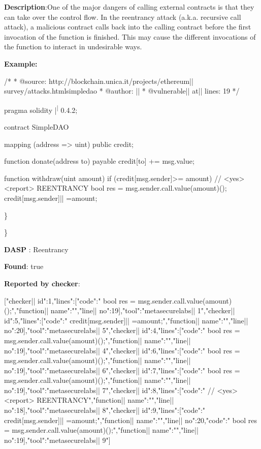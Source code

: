 \documentclass{article}
\begin{document}
\textbf{Description}:One of the major dangers of calling external contracts is that they can take over the control flow. In the reentrancy attack (a.k.a. recursive call attack), a malicious contract calls back into the calling contract before the first invocation of the function is finished. This may cause the different invocations of the function to interact in undesirable ways.


\textbf{Example:} 
\begin{ffcode} 

/*
* @source: http://blockchain.unica.it/projects/ethereum|\textendash| survey/attacks.htmlsimpledao
* @author: |\textendash| 
* @vulnerable|\textunderscore| at|\textunderscore| lines: 19
*/

pragma solidity |\textsuperscript| 0.4.2;

contract SimpleDAO {
  mapping (address => uint) public credit;

  function donate(address to) payable {
    credit[to] += msg.value;
  }

  function withdraw(uint amount) {
    if (credit[msg.sender]>= amount) {
      // <yes> <report> REENTRANCY
      bool res = msg.sender.call.value(amount)();
      credit[msg.sender]|\textendash| =amount;
    }
  }
}

\end{ffcode} 
\} 

\} 

\textbf{DASP} : Reentrancy

\textbf{Found}: true

\textbf{Reported by checker}: 
\begin{ffcode} 

[{"checker|\textunderscore| id":1,"lines":[{"code":"      bool res = msg.sender.call.value(amount)();\n","function|\textunderscore| name":"","line|\textunderscore| no":19}],"tool":"metasecurelabs|\textendash| 1"},{"checker|\textunderscore| id":5,"lines":[{"code":"      credit[msg.sender]|\textendash| =amount;\n","function|\textunderscore| name":"","line|\textunderscore| no":20}],"tool":"metasecurelabs|\textendash| 5"},{"checker|\textunderscore| id":4,"lines":[{"code":"      bool res = msg.sender.call.value(amount)();\n","function|\textunderscore| name":"","line|\textunderscore| no":19}],"tool":"metasecurelabs|\textendash| 4"},{"checker|\textunderscore| id":6,"lines":[{"code":"      bool res = msg.sender.call.value(amount)();\n","function|\textunderscore| name":"","line|\textunderscore| no":19}],"tool":"metasecurelabs|\textendash| 6"},{"checker|\textunderscore| id":7,"lines":[{"code":"      bool res = msg.sender.call.value(amount)();\n","function|\textunderscore| name":"","line|\textunderscore| no":19}],"tool":"metasecurelabs|\textendash| 7"},{"checker|\textunderscore| id":8,"lines":[{"code":"      // <yes> <report> REENTRANCY\n","function|\textunderscore| name":"","line|\textunderscore| no":18}],"tool":"metasecurelabs|\textendash| 8"},{"checker|\textunderscore| id":9,"lines":[{"code":"      credit[msg.sender]|\textendash| =amount;\n","function|\textunderscore| name":"","line|\textunderscore| no":20},{"code":"      bool res = msg.sender.call.value(amount)();\n","function|\textunderscore| name":"","line|\textunderscore| no":19}],"tool":"metasecurelabs|\textendash| 9"}]
\end{ffcode} 
\end{document}

